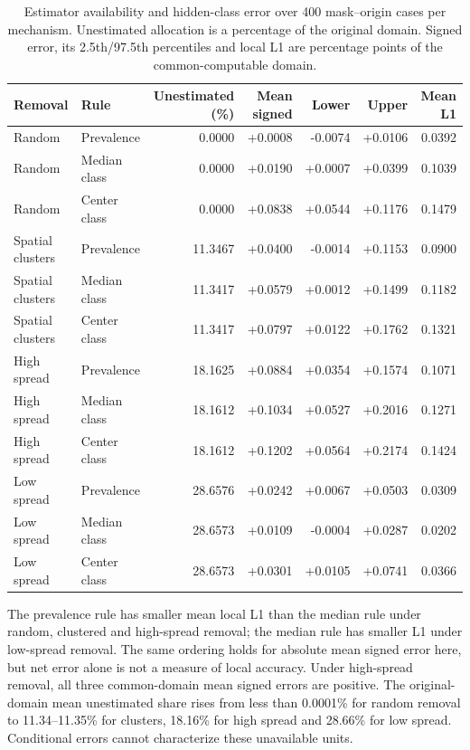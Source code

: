 \documentclass[10pt,a4paper]{article}
\begin{document}
\begin{table}[htbp]\centering\small
\caption{Estimator availability and hidden-class error over 400 mask--origin cases per mechanism. Unestimated allocation is a percentage of the original domain. Signed error, its 2.5th/97.5th percentiles and local L1 are percentage points of the common-computable domain. }
\setlength{\tabcolsep}{4pt}
\begin{tabular}{llrrrrr}\toprule
Removal & Rule & Unestimated (\%) & Mean signed & Lower & Upper & Mean L1\\\midrule
Random & Prevalence & 0.0000 & +0.0008 & -0.0074 & +0.0106 & 0.0392 \\
Random & Median class & 0.0000 & +0.0190 & +0.0007 & +0.0399 & 0.1039 \\
Random & Center class & 0.0000 & +0.0838 & +0.0544 & +0.1176 & 0.1479 \\
Spatial clusters & Prevalence & 11.3467 & +0.0400 & -0.0014 & +0.1153 & 0.0900 \\
Spatial clusters & Median class & 11.3417 & +0.0579 & +0.0012 & +0.1499 & 0.1182 \\
Spatial clusters & Center class & 11.3417 & +0.0797 & +0.0122 & +0.1762 & 0.1321 \\
High spread & Prevalence & 18.1625 & +0.0884 & +0.0354 & +0.1574 & 0.1071 \\
High spread & Median class & 18.1612 & +0.1034 & +0.0527 & +0.2016 & 0.1271 \\
High spread & Center class & 18.1612 & +0.1202 & +0.0564 & +0.2174 & 0.1424 \\
Low spread & Prevalence & 28.6576 & +0.0242 & +0.0067 & +0.0503 & 0.0309 \\
Low spread & Median class & 28.6573 & +0.0109 & -0.0004 & +0.0287 & 0.0202 \\
Low spread & Center class & 28.6573 & +0.0301 & +0.0105 & +0.0741 & 0.0366 \\
\bottomrule\end{tabular}\end{table}

The prevalence rule has smaller mean local L1 than the median rule under random, clustered and high-spread removal; the median rule has smaller L1 under low-spread removal. The same ordering holds for absolute mean signed error here, but net error alone is not a measure of local accuracy. Under high-spread removal, all three common-domain mean signed errors are positive. The original-domain mean unestimated share rises from less than 0.0001\% for random removal to 11.34--11.35\% for clusters, 18.16\% for high spread and 28.66\% for low spread. Conditional errors cannot characterize these unavailable units.
\end{document}

